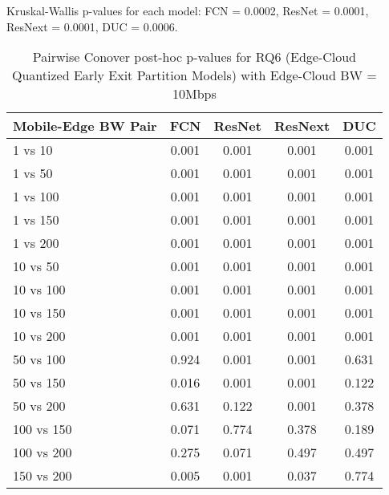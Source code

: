 \begin{table}[h]
\centering
\caption{Pairwise Conover post-hoc p-values for RQ6 (Edge-Cloud Quantized Early Exit Partition Models) with Edge-Cloud BW = 10Mbps}
\label{tab:conover_edge_cloud_quantized_earlyexit_partition_ec10}
\smallskip
Kruskal-Wallis p-values for each model: FCN = 0.0002, ResNet = 0.0001, ResNext = 0.0001, DUC = 0.0006.

\begin{tabular}{lcccc}
\toprule
Mobile-Edge BW Pair & FCN & ResNet & ResNext & DUC \\
\midrule
1 vs 10 & 0.001 & 0.001 & 0.001 & 0.001 \\
1 vs 50 & 0.001 & 0.001 & 0.001 & 0.001 \\
1 vs 100 & 0.001 & 0.001 & 0.001 & 0.001 \\
1 vs 150 & 0.001 & 0.001 & 0.001 & 0.001 \\
1 vs 200 & 0.001 & 0.001 & 0.001 & 0.001 \\
10 vs 50 & 0.001 & 0.001 & 0.001 & 0.001 \\
10 vs 100 & 0.001 & 0.001 & 0.001 & 0.001 \\
10 vs 150 & 0.001 & 0.001 & 0.001 & 0.001 \\
10 vs 200 & 0.001 & 0.001 & 0.001 & 0.001 \\
50 vs 100 & 0.924 & 0.001 & 0.001 & 0.631 \\
50 vs 150 & 0.016 & 0.001 & 0.001 & 0.122 \\
50 vs 200 & 0.631 & 0.122 & 0.001 & 0.378 \\
100 vs 150 & 0.071 & 0.774 & 0.378 & 0.189 \\
100 vs 200 & 0.275 & 0.071 & 0.497 & 0.497 \\
150 vs 200 & 0.005 & 0.001 & 0.037 & 0.774 \\
\bottomrule
\end{tabular}
\end{table}


